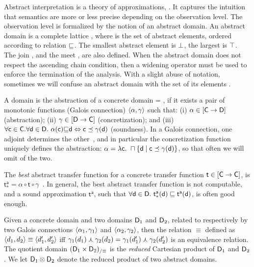 \documentclass{elsart}
\begin{document}
Abstract interpretation is a theory of approximations, \cite{CousotCousot77}.
It captures the intuition that semantics are more or less precise depending on the observation level.
The observation level is formalized by the notion of an abstract domain.
An abstract domain  is a complete lattice
, where  is the
set of abstract elements, ordered according to relation ${\sqsubseteq}$.  
The smallest abstract element is ${\bot}$, the largest is ${\top}$. 
The join \acup, and the meet \acap,  are also defined.
When the abstract domain  does not respect the ascending chain
condition, then a widening operator \awidening{} must be used to
enforce the termination of the analysis. 
With a slight abuse of notation, sometimes we will confuse an
abstract domain  with the set of its elements . 


A  domain  is the abstraction of a concrete domain
 = , if it
exists a pair of monotonic functions (Galois connection)
$\langle \alpha, \gamma \rangle$ such that: (i) $\alpha \in 
[\mathsf{C} \rightarrow\relax{\mathsf{D}}]$ (abstraction); (ii) $\gamma \in
[\relax{\mathsf{D}} \rightarrow\mathsf{C}]$ (concretization); and (iii) $\forall \mathsf{c} \in
\mathsf{C}. \forall \mathsf{d} \in \relax{\mathsf{D}}.\ \alpha(\mathsf{c}) {\sqsubseteq} \mathsf{d}
\Leftrightarrow \mathsf{c} \preceq \gamma(\mathsf{d})$ (soundness).
In a Galois connection, one adjoint determines the
other~\cite{CousotCousot77}, and in particular the concretization
function uniquely defines the abstraction: 
$\alpha = \lambda \mathsf{c}.\ \sqcap \{ \mathsf{d} \mid \mathsf{c} \preceq
\gamma(\mathsf{d}) \}$, so that often we will omit of the two.



The \emph{best} abstract transfer
function for a concrete transfer function $\mathsf{t} \in
[\mathsf{C} \rightarrow\mathsf{C}]$, is   $\mathsf{t^a_*} = \alpha \circ \mathsf{t} \circ
\gamma$~\cite{CousotCousot77}.
In general, the best abstract transfer function is not computable, and
a sound approximation $\mathsf{t^a}$, such that  $\forall \relax{\ensuremath{\mathsf{d}}} \in
\relax{\mathsf{D}}.\ \mathsf{t^a_*}(\relax{\ensuremath{\mathsf{d}}}) \sqsubseteq \mathsf{t^a}(\relax{\ensuremath{\mathsf{d}}})$, is
often good enough.

Given a concrete domain  and two domains $\relax{\mathsf{D}}_1$ and
$\relax{\mathsf{D}}_2$, related to  respectively by two Galois connections
$\langle \alpha_1, \gamma_1 \rangle$ and $\langle \alpha_2, \gamma_2 \rangle$, then
the relation $\equiv$ defined as $\langle d_1, d_2 \rangle \equiv \langle d'_1,
  d'_2 \rangle$ iff $\gamma_1(d_1) \curlywedge \gamma_2(d_2) =  \gamma_1(d'_1)
\curlywedge \gamma_2(d'_2)$ is an equivalence relation.
The quotient domain $(\relax{\mathsf{D}}_1 \times \relax{\mathsf{D}}_2)_{/\equiv}$ is 
the \emph{reduced} Cartesian product of $\relax{\mathsf{D}}_1$ and $\relax{\mathsf{D}}_2$.
We let $\relax{\mathsf{D}}_1 \otimes \relax{\mathsf{D}}_2$ denote the reduced product of
two abstract domains.
\end{document}
